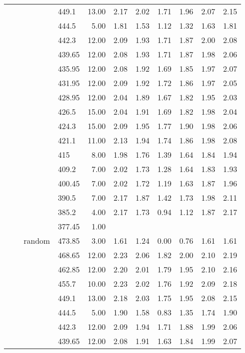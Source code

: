 \begin{longtable}{llllrrrrrrr}
   &  &  & 449.1 & 13.00 & 2.17 & 2.02 & 1.71 & 1.96 & 2.07 & 2.15 \\ 
   &  &  & 444.5 & 5.00 & 1.81 & 1.53 & 1.12 & 1.32 & 1.63 & 1.81 \\ 
   &  &  & 442.3 & 12.00 & 2.09 & 1.93 & 1.71 & 1.87 & 2.00 & 2.08 \\ 
   &  &  & 439.65 & 12.00 & 2.08 & 1.93 & 1.71 & 1.87 & 1.98 & 2.06 \\ 
   &  &  & 435.95 & 12.00 & 2.08 & 1.92 & 1.69 & 1.85 & 1.97 & 2.07 \\ 
   &  &  & 431.95 & 12.00 & 2.09 & 1.92 & 1.72 & 1.86 & 1.97 & 2.05 \\ 
   &  &  & 428.95 & 12.00 & 2.04 & 1.89 & 1.67 & 1.82 & 1.95 & 2.03 \\ 
   &  &  & 426.5 & 15.00 & 2.04 & 1.91 & 1.69 & 1.82 & 1.98 & 2.04 \\ 
   &  &  & 424.3 & 15.00 & 2.09 & 1.95 & 1.77 & 1.90 & 1.98 & 2.06 \\ 
   &  &  & 421.1 & 11.00 & 2.13 & 1.94 & 1.74 & 1.86 & 1.98 & 2.08 \\ 
   &  &  & 415 & 8.00 & 1.98 & 1.76 & 1.39 & 1.64 & 1.84 & 1.94 \\ 
   &  &  & 409.2 & 7.00 & 2.02 & 1.73 & 1.28 & 1.64 & 1.83 & 1.93 \\ 
   &  &  & 400.45 & 7.00 & 2.02 & 1.72 & 1.19 & 1.63 & 1.87 & 1.96 \\ 
   &  &  & 390.5 & 7.00 & 2.17 & 1.87 & 1.42 & 1.73 & 1.98 & 2.11 \\ 
   &  &  & 385.2 & 4.00 & 2.17 & 1.73 & 0.94 & 1.12 & 1.87 & 2.17 \\ 
   &  &  & 377.45 & 1.00 &  &  &  &  &  &  \\ 
   &  & random & 473.85 & 3.00 & 1.61 & 1.24 & 0.00 & 0.76 & 1.61 & 1.61 \\ 
   &  &  & 468.65 & 12.00 & 2.23 & 2.06 & 1.82 & 2.00 & 2.10 & 2.19 \\ 
   &  &  & 462.85 & 12.00 & 2.20 & 2.01 & 1.79 & 1.95 & 2.10 & 2.16 \\ 
   &  &  & 455.7 & 10.00 & 2.23 & 2.02 & 1.76 & 1.92 & 2.09 & 2.18 \\ 
   &  &  & 449.1 & 13.00 & 2.18 & 2.03 & 1.75 & 1.95 & 2.08 & 2.15 \\ 
   &  &  & 444.5 & 5.00 & 1.90 & 1.58 & 0.83 & 1.35 & 1.74 & 1.90 \\ 
   &  &  & 442.3 & 12.00 & 2.09 & 1.94 & 1.71 & 1.88 & 1.99 & 2.06 \\ 
   &  &  & 439.65 & 12.00 & 2.08 & 1.91 & 1.63 & 1.84 & 1.99 & 2.07 \\ 

\end{longtable}
